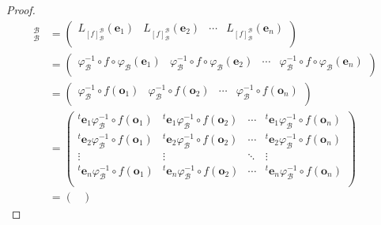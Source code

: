 \documentclass[dvipdfmx]{jsarticle}
\begin{document}
\begin{proof}
\begin{align*}
[ f]_{\mathcal{B}}^{\mathcal{B}} &= \begin{pmatrix}
L_{[ f]_{\mathcal{B}}^{\mathcal{B}}}\left( \mathbf{e}_{1} \right) & L_{[ f]_{\mathcal{B}}^{\mathcal{B}}}\left( \mathbf{e}_{2} \right) & \cdots & L_{[ f]_{\mathcal{B}}^{\mathcal{B}}}\left( \mathbf{e}_{n} \right) \\
\end{pmatrix}\\
&= \begin{pmatrix}
\varphi_{\mathcal{B}}^{- 1} \circ f \circ \varphi_{\mathcal{B}}\left( \mathbf{e}_{1} \right) & \varphi_{\mathcal{B}}^{- 1} \circ f \circ \varphi_{\mathcal{B}}\left( \mathbf{e}_{2} \right) & \cdots & \varphi_{\mathcal{B}}^{- 1} \circ f \circ \varphi_{\mathcal{B}}\left( \mathbf{e}_{n} \right) \\
\end{pmatrix}\\
&= \begin{pmatrix}
\varphi_{\mathcal{B}}^{- 1} \circ f\left( \mathbf{o}_{1} \right) & \varphi_{\mathcal{B}}^{- 1} \circ f\left( \mathbf{o}_{2} \right) & \cdots & \varphi_{\mathcal{B}}^{- 1} \circ f\left( \mathbf{o}_{n} \right) \\
\end{pmatrix}\\
&= \begin{pmatrix}
{}^{t}\mathbf{e}_{1}\varphi_{\mathcal{B}}^{- 1} \circ f\left( \mathbf{o}_{1} \right) &{}^{t}\mathbf{e}_{1}\varphi_{\mathcal{B}}^{- 1} \circ f\left( \mathbf{o}_{2} \right) & \cdots &{}^{t}\mathbf{e}_{1}\varphi_{\mathcal{B}}^{- 1} \circ f\left( \mathbf{o}_{n} \right) \\
{}^{t}\mathbf{e}_{2}\varphi_{\mathcal{B}}^{- 1} \circ f\left( \mathbf{o}_{1} \right) &{}^{t}\mathbf{e}_{2}\varphi_{\mathcal{B}}^{- 1} \circ f\left( \mathbf{o}_{2} \right) & \cdots &{}^{t}\mathbf{e}_{2}\varphi_{\mathcal{B}}^{- 1} \circ f\left( \mathbf{o}_{n} \right) \\
 \vdots & \vdots & \ddots & \vdots \\
{}^{t}\mathbf{e}_{n}\varphi_{\mathcal{B}}^{- 1} \circ f\left( \mathbf{o}_{1} \right) &{}^{t}\mathbf{e}_{n}\varphi_{\mathcal{B}}^{- 1} \circ f\left( \mathbf{o}_{2} \right) & \cdots &{}^{t}\mathbf{e}_{n}\varphi_{\mathcal{B}}^{- 1} \circ f\left( \mathbf{o}_{n} \right) \\
\end{pmatrix}\\
&= \begin{pmatrix}

\end{pmatrix}
\end{align*}
\end{proof}
\end{document}

